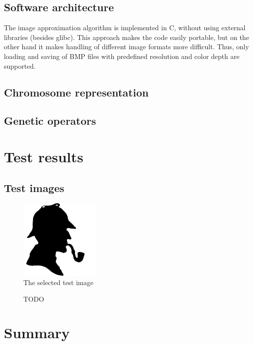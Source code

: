 \documentclass[conference]{IEEEtran}
\begin{document}
\subsection{Software architecture}

The image approximation algorithm is implemented in C,
without using external libraries (besides glibc). This
approach makes the code easily portable, but on the other
hand it makes handling of different image formats more
difficult. Thus, only loading and saving of BMP files
with predefined resolution and color depth are supported.

\subsection{Chromosome representation}

\subsection{Genetic operators}


\section{Test results}

\subsection{Test images}

\begin{figure}[htbp]
	\centering
	\includegraphics[width=0.35\textwidth]{fig/sherlock-orig.png}
	\caption{The selected test image}
	\label{sherlock-orig}
\end{figure}

\begin{figure}[htbp]
	\centering
		\resizebox{.45\textwidth}{!}{}
	\caption{TODO}
	\label{foo}
\end{figure}


\section{Summary}
\end{document}
